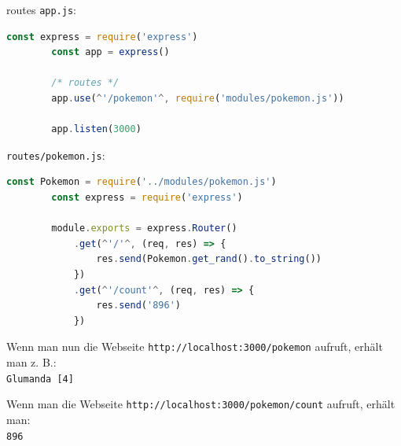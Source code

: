 \begin{example}{routes}
    \texttt{app.js}:
    \begin{lstlisting}[language=JavaScript]
        const express = require('express')
        const app = express()

        /* routes */
        app.use(^'/pokemon'^, require('modules/pokemon.js'))

        app.listen(3000)
    \end{lstlisting}

    \texttt{routes/pokemon.js}:
    \begin{lstlisting}[language=JavaScript]
        const Pokemon = require('../modules/pokemon.js')
        const express = require('express')
        
        module.exports = express.Router()
            .get(^'/'^, (req, res) => {
                res.send(Pokemon.get_rand().to_string())
            })
            .get(^'/count'^, (req, res) => {
                res.send('896')
            })
    \end{lstlisting}

    Wenn man nun die Webseite \texttt{http://localhost:3000/pokemon} aufruft, erhält man z. B.:\\
    \texttt{Glumanda [4]}

    Wenn man die Webseite \texttt{http://localhost:3000/pokemon/count} aufruft, erhält man:\\
    \texttt{896}
\end{example}

